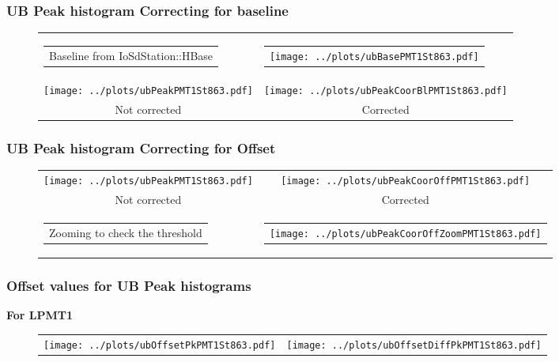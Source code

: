 \documentclass[aspectratio=169]{beamer}
\begin{document}
\begin{frame}
	\frametitle{UB Peak histogram Correcting for baseline}
	
	\begin{figure}
		\centering
		\begin{tabularx}{\textwidth}{CC}
			\begin{tabular}{l}
				Baseline from IoSdStation::HBase
			\end{tabular}
			&
			\begin{tabular}{l} 
				\texttt{[image: ../plots/ubBasePMT1St863.pdf]}
			\end{tabular}
			\\
			\texttt{[image: ../plots/ubPeakPMT1St863.pdf]}
			&
			\texttt{[image: ../plots/ubPeakCoorBlPMT1St863.pdf]}
			\\
			Not corrected & Corrected \\
		\end{tabularx}
	\end{figure}
\end{frame}


\begin{frame}
	\frametitle{UB Peak histogram Correcting for Offset}
	
	\begin{figure}
		\centering
		\begin{tabularx}{\textwidth}{CC}
			\texttt{[image: ../plots/ubPeakPMT1St863.pdf]}
			&
			\texttt{[image: ../plots/ubPeakCoorOffPMT1St863.pdf]}
			\\
			Not corrected & Corrected
			\\
			\begin{tabular}{l}
				Zooming to check the threshold
			\end{tabular}
			&
			\begin{tabular}{l}
				\texttt{[image: ../plots/ubPeakCoorOffZoomPMT1St863.pdf]}
			\end{tabular}
		\end{tabularx}
	\end{figure}
\end{frame}



\begin{frame}
	\frametitle{Offset values for UB Peak histograms}
	{\bf For LPMT1}
	\begin{figure}
		\centering
		\begin{tabularx}{\textwidth}{CC}
			\texttt{[image: ../plots/ubOffsetPkPMT1St863.pdf]}
			&
			\texttt{[image: ../plots/ubOffsetDiffPkPMT1St863.pdf]}
		\end{tabularx}
	\end{figure}
\end{frame}
			
\end{document}
